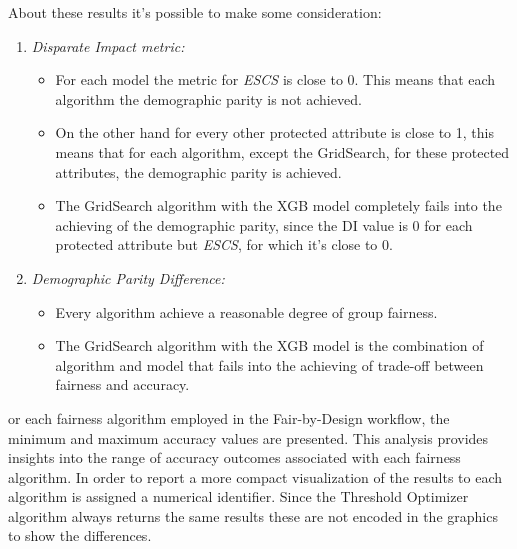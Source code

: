 About these results it's possible to make some consideration:

\begin{enumerate}

    \item \emph{Disparate Impact metric:}
    \begin{itemize}
        
        \item For each model the metric for \emph{ESCS} is close to 0. This means that each algorithm the demographic parity is not achieved.

        \item On the other hand for every other protected attribute is close to 1, this means that for each algorithm, except the GridSearch, for these protected attributes, the demographic parity is achieved.

        \item The GridSearch algorithm with the XGB model completely fails into the achieving of the demographic parity, since the DI value is 0 for each protected attribute but \emph{ESCS}, for which it's close to 0.
    
    \end{itemize}

    \item \emph{Demographic Parity Difference:}
    \begin{itemize}

        \item Every algorithm achieve a reasonable degree of group fairness.

        \item The GridSearch algorithm with the XGB model is the combination of algorithm and model that fails into the achieving of trade-off between fairness and accuracy.

    \end{itemize}

\end{enumerate}

or each fairness algorithm employed in the Fair-by-Design workflow, the minimum and maximum accuracy values are presented. This analysis provides insights into the range of accuracy outcomes associated with each fairness algorithm.
In order to report a more compact visualization of the results to each algorithm is assigned a numerical identifier. Since the Threshold Optimizer algorithm always returns the same results these are not encoded in the graphics to show the differences.

